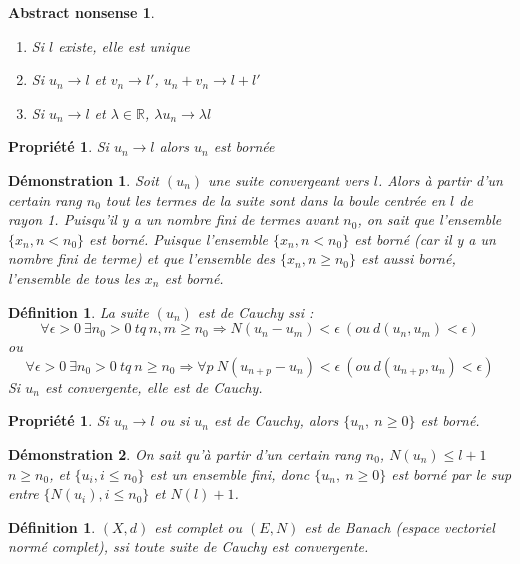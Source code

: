 \documentclass[a4paper, oneside]{report}
\theoremstyle{break}
\newtheorem{defi}[thm]{Définition}
\newtheorem{propr}[thm]{Propriété}
\newtheorem*{demo}{Démonstration}
\newtheorem*{absnon}{Abstract nonsense}
\newcommand{\R}{\mathbb{R}}
\begin{document}
\begin{absnon}
\begin{enumerate}
\item Si $l$ existe, elle est unique
\item Si $u_n \rightarrow l$ et $v_n\rightarrow l'$, $u_n+v_n \rightarrow l+l'$
\item Si $u_n \rightarrow l$ et $\lambda \in \R$, $\lambda u_n \rightarrow \lambda l$
\end{enumerate}
\end{absnon}


\begin{propr}
Si $u_n\rightarrow l$ alors $u_n$ est bornée
\end{propr}


\begin{demo}
Soit $(u_n)$ une suite convergeant vers $l$.
Alors à partir d'un certain rang $n_0$ tout les termes de la suite sont dans la boule centrée en $l$ de rayon 1.
Puisqu'il y a un nombre fini de termes avant $n_0$, on sait que l'ensemble $\{x_n, n < n_0\}$ est borné.
Puisque l'ensemble $\{x_n,  n < n_0\}$ est borné (car il y a un nombre fini de terme) et que l'ensemble des $\{x_n,  n \geq n_0\}$ est aussi borné, l'ensemble de tous les $x_n$ est borné.
\end{demo}


\begin{defi}                    

La suite $(u_n)$ est de Cauchy ssi :
$$\forall \epsilon >0~ \exists n_0>0~tq~n,m\geq n_0 \Rightarrow N(u_n-u_m)<\epsilon~(ou~d(u_n,u_m)<\epsilon)$$
ou 
$$\forall \epsilon >0~ \exists n_0>0~tq~n\geq n_0 \Rightarrow \forall p~N(u_{n+p}-u_n)<\epsilon~(ou~d(u_{n+p},u_n)<\epsilon)$$
Si $u_n$ est convergente, elle est de Cauchy.
\end{defi}

\begin{propr}

Si $u_n \rightarrow l$ ou si $u_n$ est de Cauchy, alors $\{u_n,~n\geq 0 \}$ est borné.
\end{propr}


\begin{demo}
On sait qu'à partir d'un certain rang $n_0$, $N(u_n) \leq l+1$ $n\geq n_0$, et $\{u_i, i\leq n_0 \}$ est un ensemble fini, donc $\{u_n,~n\geq 0 \}$ est borné par le sup entre $\{N(u_i), i\leq n_0 \}$ et $N(l)+1$.
\end{demo}


\begin{defi}                    

$(X,d)$ est complet ou $(E,N)$ est de Banach (espace vectoriel normé complet), ssi toute suite de Cauchy est convergente.
\end{defi}
\end{document}
